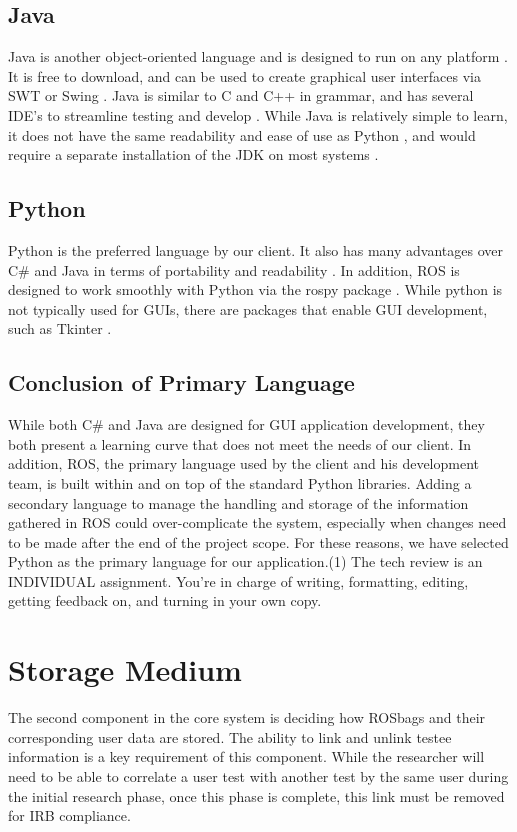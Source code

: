 \documentclass[onecolumn, draftclsnofoot,10pt, compsoc]{report}
\begin{document}
\subsection{Java}
Java is another object-oriented language and is designed to run on any platform \cite{WhatIsJava}. It is free to download, and can be used to create graphical user interfaces via SWT or Swing \cite{JavaGraphics}. Java is similar to C and C++ in grammar, and has several IDE's to streamline testing and develop \cite{JavaIDE}. While Java is relatively simple to learn, it does not have the same readability and ease of use as Python \cite{JavaVPython}, and would require a separate installation of the JDK on most systems \cite{JavaGettingStarted}.
\subsection{Python}
Python is the preferred language by our client. It also has many advantages over C\# and Java in terms of portability and readability \cite{JavaVPython}. In addition, ROS is designed to work smoothly with Python via the rospy package \cite{ROSpy}. While python is not typically used for GUIs, there are packages that enable GUI development, such as Tkinter \cite{Tkinter}. 
\subsection{Conclusion of Primary Language}
While both C\# and Java are designed for GUI application development, they both present a learning curve that does not meet the needs of our client. In addition, ROS, the primary language used by the client and his development team, is built within and on top of the standard Python libraries. Adding a secondary language to manage the handling and storage of the information gathered in ROS could over-complicate the system, especially when changes need to be made after the end of the project scope. For these reasons, we have selected Python as the primary language for our application.(1)     The tech review is an INDIVIDUAL assignment. You’re in charge of writing, formatting, editing, getting feedback on, and turning in your own copy.  



\section{Storage Medium}
The second component in the core system is deciding how ROSbags and their corresponding user data are stored. The ability to link and unlink testee information is a key requirement of this component. While the researcher will need to be able to correlate a user test with another test by the same user during the initial research phase, once this phase is complete, this link must be removed for IRB compliance. 
\end{document}

